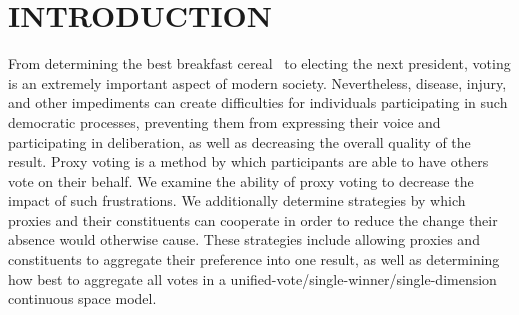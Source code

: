%
%

\chapter{INTRODUCTION}\label{ch:introduction}
\thispagestyle{empty}
From determining the best breakfast cereal~\cite{Curtis2021} to electing the next
president, voting is an extremely important aspect of modern society.
Nevertheless, disease, injury, and other impediments can create difficulties for
individuals participating in such democratic processes, preventing them from
expressing their voice and participating in deliberation, as well as decreasing
the overall quality of the result.
Proxy voting is a method by which participants are able to have others vote on their
behalf.
We examine the ability of proxy voting to decrease the impact of such frustrations.
We additionally determine strategies by which proxies and their constituents can
cooperate in order to reduce the change their absence would otherwise cause.
These strategies include allowing proxies and constituents to aggregate their
preference into one result, as well as determining how best to aggregate all votes
in a unified-vote/single-winner/single-dimension continuous space model.


\newpage

\newpage

\newpage

\newpage


